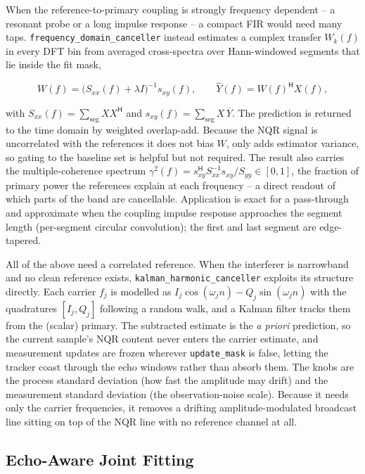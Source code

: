 \documentclass[11pt,oneside]{report}
\newcommand{\code}[1]{\texttt{#1}}
\begin{document}
When the reference-to-primary coupling is strongly frequency dependent -- a
resonant probe or a long impulse response -- a compact FIR would need many taps.
\code{frequency\_domain\_canceller} instead estimates a complex transfer
\(W_k(f)\) in every DFT bin from averaged cross-spectra over Hann-windowed
segments that lie inside the fit mask,

\[
  W(f) = \bigl(S_{xx}(f) + \lambda I\bigr)^{-1} s_{xy}(f),
  \qquad
  \widehat{Y}(f) = W(f)^{\mathsf H} X(f),
\]

with \(S_{xx}(f)=\sum_{\mathrm{seg}} X X^{\mathsf H}\) and
\(s_{xy}(f)=\sum_{\mathrm{seg}} X\,\overline{Y}\). The prediction is returned to
the time domain by weighted overlap-add. Because the NQR signal is uncorrelated
with the references it does not bias \(W\), only adds estimator variance, so
gating to the baseline set is helpful but not required. The result also carries
the multiple-coherence spectrum
\(\gamma^2(f)=s_{xy}^{\mathsf H} S_{xx}^{-1} s_{xy}/S_{yy}\in[0,1]\), the fraction
of primary power the references explain at each frequency -- a direct readout of
which parts of the band are cancellable. Application is exact for a pass-through
and approximate when the coupling impulse response approaches the segment length
(per-segment circular convolution); the first and last segment are edge-tapered.

All of the above need a correlated reference. When the interferer is narrowband
and no clean reference exists, \code{kalman\_harmonic\_canceller} exploits its
structure directly. Each carrier \(f_j\) is modelled as
\(I_j\cos(\omega_j n) - Q_j\sin(\omega_j n)\) with the quadratures
\([I_j, Q_j]\) following a random walk, and a Kalman filter tracks them from the
(scalar) primary. The subtracted estimate is the \emph{a priori} prediction, so
the current sample's NQR content never enters the carrier estimate, and
measurement updates are frozen wherever \code{update\_mask} is false, letting the
tracker coast through the echo windows rather than absorb them. The knobs are the
process standard deviation (how fast the amplitude may drift) and the measurement
standard deviation (the observation-noise scale). Because it needs only the
carrier frequencies, it removes a drifting amplitude-modulated broadcast line
sitting on top of the NQR line with no reference channel at all.

\subsection{Echo-Aware Joint Fitting}
\end{document}
